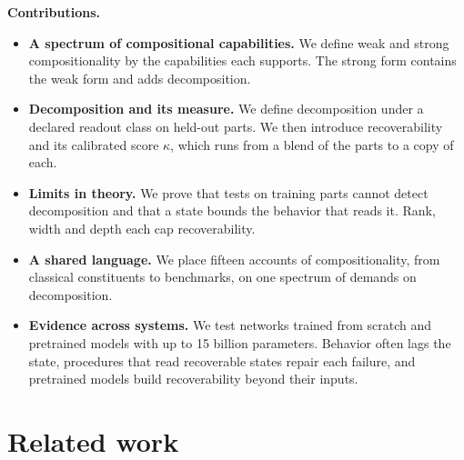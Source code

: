 \textbf{Contributions.}
\begin{itemize}
  \item \textbf{A spectrum of compositional capabilities.} We define weak and strong compositionality by the capabilities each supports. The strong form contains the weak form and adds decomposition.
  \item \textbf{Decomposition and its measure.} We define decomposition under a declared readout class on held-out parts. We then introduce recoverability and its calibrated score $\kappa$, which runs from a blend of the parts to a copy of each.
  \item \textbf{Limits in theory.} We prove that tests on training parts cannot detect decomposition and that a state bounds the behavior that reads it. Rank, width and depth each cap recoverability.
  \item \textbf{A shared language.} We place fifteen accounts of compositionality, from classical constituents to benchmarks, on one spectrum of demands on decomposition.
  \item \textbf{Evidence across systems.} We test networks trained from scratch and pretrained models with up to 15 billion parameters. Behavior often lags the state, procedures that read recoverable states repair each failure, and pretrained models build recoverability beyond their inputs.
\end{itemize}

\section{Related work}
